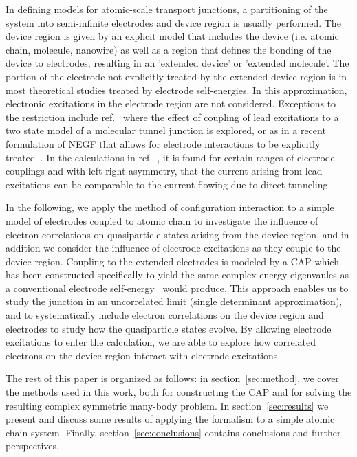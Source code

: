 In defining models for atomic-scale transport junctions, a partitioning
of the system into semi-infinite electrodes and device region is usually
performed. The device region is given by an explicit model that includes
the device (i.e. atomic chain, molecule, nanowire) as well as a region
that defines the bonding of the device to electrodes, resulting in an
'extended device' or 'extended molecule'. The portion of the
electrode not explicitly treated by the extended device region is in
most theoretical studies treated by electrode self-energies. In this
approximation, electronic excitations in the electrode region are not
considered. Exceptions to the restriction include
ref.~\cite{galperin_nitzan2006leadexcitations} where the effect of coupling
of lead excitations to a two state model of a molecular tunnel junction is
explored, or as in a recent formulation of \ac{NEGF} that allows for
electrode interactions to be explicitly treated~\cite{ness2012jpa_leadnegf}.
In the calculations in ref.~\cite{galperin_nitzan2006leadexcitations}, it is
found for certain ranges of electrode couplings and with left-right asymmetry,
that the current arising from lead excitations can be comparable to the
current flowing due to direct tunneling.

In the following, we apply the method of configuration interaction to a
simple model of electrodes coupled to atomic chain to investigate the
influence of electron correlations on quasiparticle states arising from
the device region, and in addition we consider the influence of electrode
excitations as they couple to the device region. Coupling to the extended
electrodes is modeled by a \ac{CAP} which has been constructed specifically to
yield the same complex energy eigenvaules as a conventional electrode
self-energy~\cite{henderson} would produce. This approach enables us to study
the junction in an uncorrelated limit (single determinant approximation), and
to systematically include electron correlations on the device region and
electrodes to study how the quasiparticle states evolve. By allowing electrode
excitations to enter the calculation, we are able to explore how correlated
electrons on the device region interact with electrode excitations.

The rest of this paper is organized as follows: in
section~\ref{sec:method}, we cover the methods used in this work, both for
constructing the \ac{CAP} and for solving the resulting complex symmetric
many-body problem. In section~\ref{sec:results} we present and discuss some
results of applying the formalism to a simple atomic chain system. Finally,
section~\ref{sec:conclusions} contains conclusions and further perspectives.

